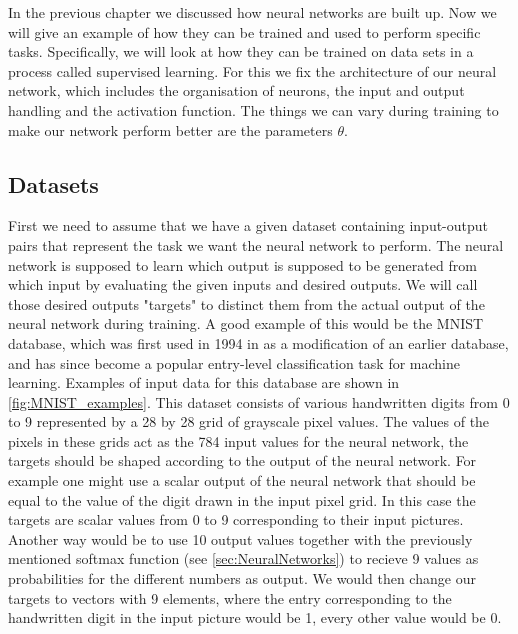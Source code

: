In the previous chapter we discussed how neural networks are built up. Now we will give an example of how they can be trained and used to perform specific tasks. Specifically, we will look at how they can be trained on data sets in a process called supervised learning. For this we fix the architecture of our neural network, which includes the organisation of neurons, the input and output handling and the activation function. The things we can vary during training to make our network perform better are the parameters $\theta$.

\subsection{Datasets}
First we need to assume that we have a given dataset containing input-output pairs that represent the task we want the neural network to perform. The neural network is supposed to learn which output is supposed to be generated from which input by evaluating the given inputs and desired outputs. We will call those desired outputs "targets" to distinct them from the actual output of the neural network during training. A good example of this would be the MNIST database, which was first used in 1994 in \cite{firstMNISTpaper}as a modification of an earlier database, and has since become a popular entry-level classification task for machine learning. Examples of input data for this database are shown in \cref{fig:MNIST_examples}. 
This dataset consists of various handwritten digits from 0 to 9 represented by a 28 by 28 grid of grayscale pixel values. The values of the pixels in these grids act as the 784 input values for the neural network, the targets should be shaped according to the output of the neural network. For example one might use a scalar output of the neural network that should be equal to the value of the digit drawn in the input pixel grid. In this case the targets are scalar values from 0 to 9 corresponding to their input pictures. Another way would be to use 10 output values together with the previously mentioned softmax function (see \cref{sec:NeuralNetworks}) to recieve 9 values as probabilities for the different numbers as output. We would then change our targets to vectors with 9 elements, where the entry corresponding to the handwritten digit in the input picture would be 1, every other value would be 0.\\

